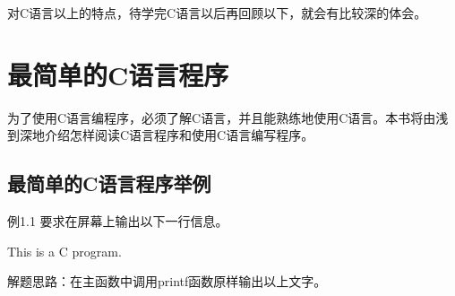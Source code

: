 对C语言以上的特点，待学完C语言以后再回顾以下，就会有比较深的体会。

\section{最简单的C语言程序}

为了使用C语言编程序，必须了解C语言，并且能熟练地使用C语言。本书将由浅到深地介绍怎样阅读C语言程序和使用C语言编写程序。

\subsection{最简单的C语言程序举例}

例1.1 要求在屏幕上输出以下一行信息。

This is a C program.

解题思路：在主函数中调用printf函数原样输出以上文字。

